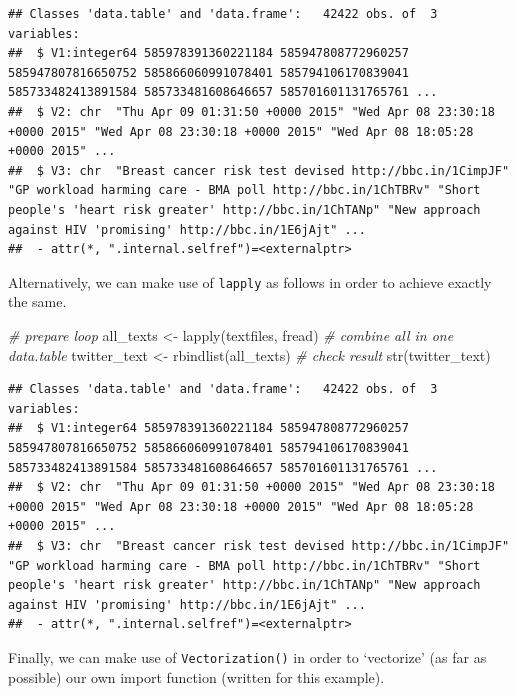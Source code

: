 \documentclass[
  12pt,
]{style/krantz}
\newenvironment{Shaded}{\begin{snugshade}}{\end{snugshade}}
\newcommand{\CommentTok}[1]{\textcolor[rgb]{0.56,0.35,0.01}{\textit{#1}}}
\newcommand{\FunctionTok}[1]{\textcolor[rgb]{0.00,0.00,0.00}{#1}}
\newcommand{\NormalTok}[1]{#1}
\newcommand{\OtherTok}[1]{\textcolor[rgb]{0.56,0.35,0.01}{#1}}
\begin{document}
\begin{verbatim}
## Classes 'data.table' and 'data.frame':   42422 obs. of  3 variables:
##  $ V1:integer64 585978391360221184 585947808772960257 585947807816650752 585866060991078401 585794106170839041 585733482413891584 585733481608646657 585701601131765761 ... 
##  $ V2: chr  "Thu Apr 09 01:31:50 +0000 2015" "Wed Apr 08 23:30:18 +0000 2015" "Wed Apr 08 23:30:18 +0000 2015" "Wed Apr 08 18:05:28 +0000 2015" ...
##  $ V3: chr  "Breast cancer risk test devised http://bbc.in/1CimpJF" "GP workload harming care - BMA poll http://bbc.in/1ChTBRv" "Short people's 'heart risk greater' http://bbc.in/1ChTANp" "New approach against HIV 'promising' http://bbc.in/1E6jAjt" ...
##  - attr(*, ".internal.selfref")=<externalptr>
\end{verbatim}

Alternatively, we can make use of \texttt{lapply} as follows in order to achieve exactly the same.

\begin{Shaded}
\begin{Highlighting}[]
\CommentTok{\# prepare loop}
\NormalTok{all\_texts }\OtherTok{\textless{}{-}} \FunctionTok{lapply}\NormalTok{(textfiles, fread)}
\CommentTok{\# combine all in one data.table}
\NormalTok{twitter\_text }\OtherTok{\textless{}{-}} \FunctionTok{rbindlist}\NormalTok{(all\_texts)}
\CommentTok{\# check result}
\FunctionTok{str}\NormalTok{(twitter\_text)}
\end{Highlighting}
\end{Shaded}

\begin{verbatim}
## Classes 'data.table' and 'data.frame':   42422 obs. of  3 variables:
##  $ V1:integer64 585978391360221184 585947808772960257 585947807816650752 585866060991078401 585794106170839041 585733482413891584 585733481608646657 585701601131765761 ... 
##  $ V2: chr  "Thu Apr 09 01:31:50 +0000 2015" "Wed Apr 08 23:30:18 +0000 2015" "Wed Apr 08 23:30:18 +0000 2015" "Wed Apr 08 18:05:28 +0000 2015" ...
##  $ V3: chr  "Breast cancer risk test devised http://bbc.in/1CimpJF" "GP workload harming care - BMA poll http://bbc.in/1ChTBRv" "Short people's 'heart risk greater' http://bbc.in/1ChTANp" "New approach against HIV 'promising' http://bbc.in/1E6jAjt" ...
##  - attr(*, ".internal.selfref")=<externalptr>
\end{verbatim}

Finally, we can make use of \texttt{Vectorization()} in order to `vectorize' (as far as possible) our own import function (written for this example).
\end{document}
